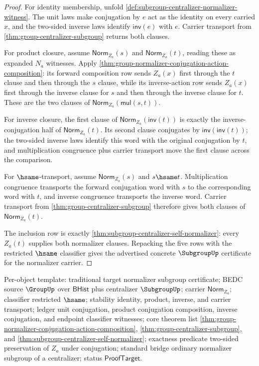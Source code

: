 \begin{proof}
For identity membership, unfold
\autoref{def:subgroup-centralizer-normalizer-witness}. The unit laws make
conjugation by $e$ act as the identity on every carried $x$, and the two-sided
inverse laws identify $\mathsf{inv}(e)$ with $e$. Carrier transport from
\autoref{thm:group-centralizer-subgroup} returns both clauses.

For product closure, assume $\mathsf{Norm}_{Z_a}(s)$ and
$\mathsf{Norm}_{Z_a}(t)$, reading these as expanded $N_a$ witnesses. Apply
\autoref{thm:group-normalizer-conjugation-action-composition}: its forward
composition row sends $Z_a(x)$ first through the $t$ clause and then through the
$s$ clause, while its inverse-action row sends $Z_a(x)$ first through the
inverse clause for $s$ and then through the inverse clause for $t$. These are
the two clauses of $\mathsf{Norm}_{Z_a}(\mathsf{mul}(s,t))$.

For inverse closure, the first clause of
$\mathsf{Norm}_{Z_a}(\mathsf{inv}(t))$ is exactly the inverse-conjugation half
of $\mathsf{Norm}_{Z_a}(t)$. Its second clause conjugates by
$\mathsf{inv}(\mathsf{inv}(t))$; the two-sided inverse laws identify this word
with the original conjugation by $t$, and multiplication congruence plus
carrier transport move the first clause across the comparison.

For $\hsame$-transport, assume $\mathsf{Norm}_{Z_a}(s)$ and $s\hsame t$.
Multiplication congruence transports the forward conjugation word with $s$ to
the corresponding word with $t$, and inverse congruence transports the inverse
word. Carrier transport from \autoref{thm:group-centralizer-subgroup} therefore
gives both clauses of $\mathsf{Norm}_{Z_a}(t)$.

The inclusion row is exactly
\autoref{thm:subgroup-centralizer-self-normalizer}: every $Z_a(t)$ supplies both
normalizer clauses. Repacking the five rows with the restricted $\hsame$
classifier gives the advertised concrete $\SubgroupUp$ certificate for the
normalizer carrier.
\end{proof}

Per-object template: traditional target normalizer subgroup certificate; BEDC
source $\GroupUp$ over $\mathsf{BHist}$ plus centralizer $\SubgroupUp$; carrier
$\mathsf{Norm}_{Z_a}$; classifier restricted $\hsame$; stability identity,
product, inverse, and carrier transport; ledger unit conjugation, product
conjugation composition, inverse conjugation, and endpoint classifier witnesses;
core theorem list \autoref{thm:group-normalizer-conjugation-action-composition},
\autoref{thm:group-centralizer-subgroup}, and
\autoref{thm:subgroup-centralizer-self-normalizer}; exactness predicate
two-sided preservation of $Z_a$ under conjugation; standard bridge ordinary
normalizer subgroup of a centralizer; status $\mathsf{ProofTarget}$.
